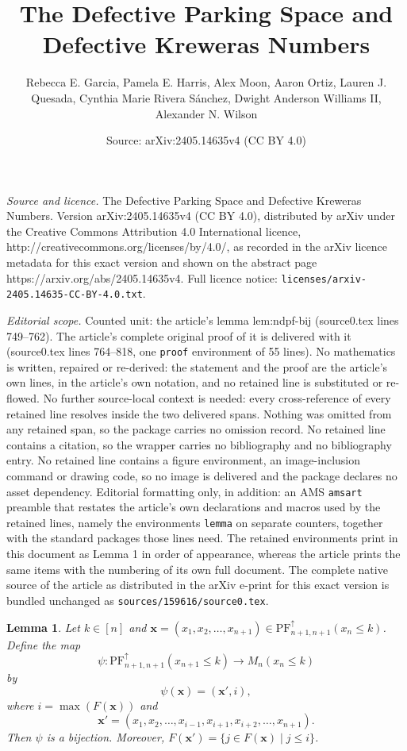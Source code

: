 \documentclass[10pt,a4paper]{amsart}
\title{The Defective Parking Space and Defective Kreweras Numbers}
\author{Rebecca E. Garcia, Pamela E. Harris, Alex Moon, Aaron Ortiz, Lauren J. Quesada, Cynthia Marie Rivera S\'anchez, Dwight Anderson Williams II, Alexander N. Wilson}
\date{Source: arXiv:2405.14635v4 (CC BY 4.0)}
\newtheorem{lemma}{Lemma}
\newcommand{\NDPF}{\mathrm{PF}^{\uparrow}}
\newcommand{\x}{\mathbf{x}}
\begin{document}
\maketitle

\noindent\emph{Source and licence.} The Defective Parking Space and Defective Kreweras Numbers. Version arXiv:2405.14635v4 (CC BY 4.0), distributed by arXiv under the Creative Commons Attribution 4.0 International licence, http://creativecommons.org/licenses/by/4.0/, as recorded in the arXiv licence metadata for this exact version and shown on the abstract page https://arxiv.org/abs/2405.14635v4. Full licence notice: \texttt{licenses/arxiv-2405.14635-CC-BY-4.0.txt}.\par\smallskip

\noindent\textit{Editorial scope.} Counted unit: the article's lemma lem:ndpf-bij (source0.tex lines 749--762). The article's complete original proof of it is delivered with it (source0.tex lines 764--818, one \texttt{proof} environment of 55 lines). No mathematics is written, repaired or re-derived: the statement and the proof are the article's own lines, in the article's own notation, and no retained line is substituted or re-flowed.  No further source-local context is needed: every cross-reference of every retained line resolves inside the two delivered spans.  Nothing was omitted from any retained span, so the package carries no omission record.  No retained line contains a citation, so the wrapper carries no bibliography and no bibliography entry.  No retained line contains a figure environment, an image-inclusion command or drawing code, so no image is delivered and the package declares no asset dependency.  Editorial formatting only, in addition: an AMS \texttt{amsart} preamble that restates the article's own declarations and macros used by the retained lines, namely the environments \texttt{lemma} on separate counters, together with the standard packages those lines need.  The retained environments print in this document as Lemma 1 in order of appearance, whereas the article prints the same items with the numbering of its own full document.  The complete native source of the article as distributed in the arXiv e-print for this exact version is bundled unchanged as \texttt{sources/159616/source0.tex}.
\begin{lemma}\label{lem:ndpf-bij}
    Let $k \in [n]$ and $\x=(x_1,x_2,\ldots,x_{n+1})\in \NDPF_{n+1,n+1}(x_n \leq k)$.
    Define the  map \[\psi: \NDPF_{n+1,n+1}(x_{n+1}\leq k) \to M_{n}(x_n \leq k)\]
    by 
    \[\psi(\x )=(\x',i),\] 
    where 
    $i = \max(F(\x))$ and
    \[\x' = (x_1,x_2,\ldots,x_{i-1},x_{i+1},x_{i+2},\ldots,x_{n+1}).\]
Then 
$\psi$ is a bijection.
Moreover, 
    $F(\x') = \{j \in F(\x) \mid j \leq i\}$.

\end{lemma}
\end{document}
